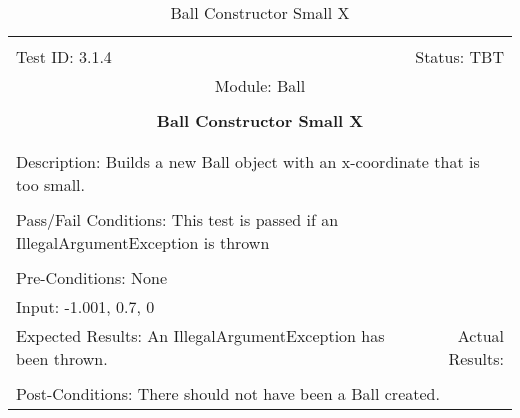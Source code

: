 \documentclass[titlepage]{article}
\begin{document}
\begin{center}%
\begin{table}[h!]
\begin{tabular}{|l r|}\hline&\\[-2mm]
	Test ID: 3.1.4	&Status: TBT\\[-3mm]
	\multicolumn{2}{|c|}{Module: Ball}\\&\\
	\multicolumn{2}{|c|}{\textbf{\large{Ball Constructor Small X}}}\\&\\\hline&\\[-3mm]
	\multicolumn{2}{|p{\textwidth}|}{Description: Builds a new Ball object with an x-coordinate that is too small.}\\[1mm]\hline&\\[-3mm]
	\multicolumn{2}{|p{\textwidth}|}{Pass/Fail Conditions: This test is passed if an IllegalArgumentException is thrown}\\[1mm]\hline&\\[-3mm]
	\multicolumn{2}{|p{\textwidth}|}{Pre-Conditions: None}\\[4mm]
	\multicolumn{2}{|p{\textwidth}|}{Input: -1.001, 0.7, 0}\\[2mm]\hline
	\multicolumn{1}{|p{0.49\textwidth}}{Expected Results: An IllegalArgumentException has been thrown.}	&\multicolumn{1}{|p{0.45\textwidth}|}{Actual Results:}\\\hline&\\[-3mm]
	\multicolumn{2}{|p{\textwidth}|}{Post-Conditions: There should not have been a Ball created.}\\\hline
\end{tabular}
\caption{Ball Constructor Small X}
\end{table}
\end{center}
\end{document}
